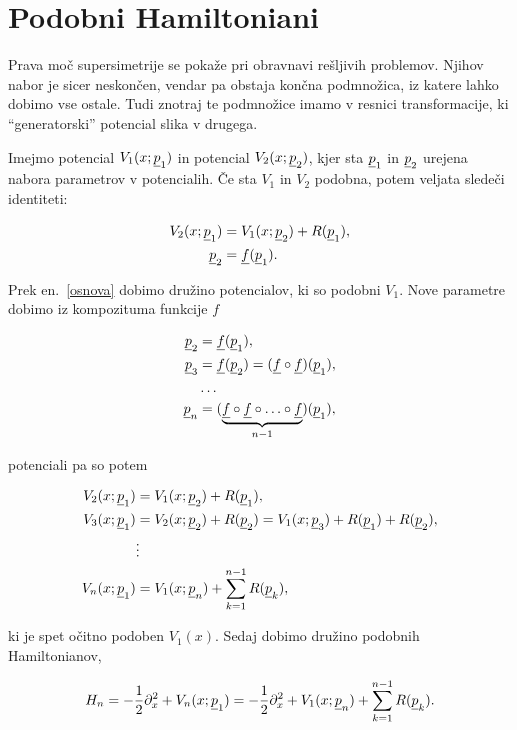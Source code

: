 \section{Podobni Hamiltoniani}

Prava mo\v c supersimetrije se poka\v ze pri obravnavi re\v sljivih problemov. Njihov nabor je sicer neskon\v cen,
vendar pa obstaja kon\v cna podmno\v zica, iz katere lahko dobimo vse ostale. Tudi znotraj te podmno\v zice imamo
v resnici transformacije, ki "`generatorski"' potencial slika v drugega.

Imejmo potencial $V_1 (x; \underline{p}_1)$ in potencial
$V_2 (x; \underline{p}_2)$, kjer sta $\underline{p}_1$ in $\underline{p}_2$ urejena nabora parametrov v potencialih. \v Ce sta
$V_1$ in $V_2$ podobna, potem veljata slede\v ci identiteti:

\begin{align}
	V_2 (x; \underline{p}_1) &= V_1 (x; \underline{p}_2) + R (\underline{p}_1), \\
	\underline{p}_2 &= \underline{f} (\underline{p}_1). \label{osnova}
\end{align}

\ni Prek en.~\eqref{osnova} dobimo dru\v zino potencialov, ki so podobni $V_1$. Nove parametre dobimo iz
kompozituma funkcije $f$

\begin{align}
	\underline{p}_2 &= \underline{f} (\underline{p}_1), \notag \\
	\underline{p}_3 &= \underline{f} (\underline{p}_2) = (\underline{f} \circ \underline{f}) (\underline{p}_1), \notag \\
	&\ldots \notag \\
	\underline{p}_n &= (\underbrace{\underline{f} \circ \underline{f} \circ \ldots \circ \underline{f}}_{n-1}) (\underline{p}_1),
\end{align}

\ni potenciali pa so potem

\begin{align}
	V_2 (x; \underline{p}_1) &= V_1 (x; \underline{p}_2) + R (\underline{p}_1), \notag \\
	V_3 (x; \underline{p}_1) &= V_2 (x; \underline{p}_2) + R (\underline{p}_2) = V_1 (x; \underline{p}_3) + R (\underline{p}_1) + R (\underline{p}_2), \notag \\
	&\vdots \notag \\
	V_n (x; \underline{p}_1) &= V_1 (x; \underline{p}_n) + \sum_{k = 1}^{n-1} R (\underline{p}_k),
\end{align}

\ni ki je spet o\v citno podoben $V_1 (x)$. Sedaj dobimo dru\v zino podobnih Hamiltonianov,

\begin{equation}
	H_n = - \frac{1}{2}\partial_x^2 + V_n (x;\underline{p}_1) = - \frac{1}{2}\partial_x^2+V_1(x;\underline{p}_n)+\sum_{k = 1}^{n-1}R(\underline{p}_k).
\end{equation}

